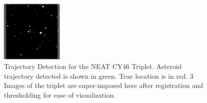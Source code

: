 \begin{figure}[!]
\vspace{-0.3cm}
\begin{center}
\includegraphics[width=0.27\textwidth]{Figures/NEATLines_LogicalImg.pdf}
\end{center}
\vspace{-0.7cm}
\caption{Trajectory Detection for the NEAT CY46 Triplet. Asteroid trajectory detected is shown in green. True location is in red. 3 Images of the triplet are super-imposed here after registration and thresholding for ease of visualization.}
\label{fig:IPP_NEAT_Trajectory}
\vspace{-0.3cm}
\end{figure}


